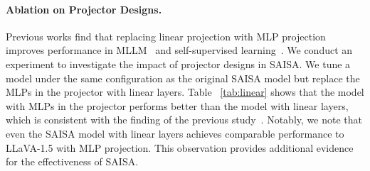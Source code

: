 \paragraph{Ablation on Projector Designs.}
Previous works find that replacing linear projection with MLP projection improves performance in MLLM~\cite{liu2024improvedbaselinesvisualinstruction} and self-supervised learning~\cite{chen2020simpleframeworkcontrastivelearning, chen2020improvedbaselinesmomentumcontrastive}.
We conduct an experiment to investigate the impact of projector designs in SAISA.
We tune a model under the same configuration as the original SAISA model but replace the MLPs in the projector with linear layers.
Table ~\ref{tab:linear} shows that the model with MLPs in the projector performs better than the model with linear layers, which is consistent with the finding of the previous study~\cite{liu2024improvedbaselinesvisualinstruction}.
Notably, we note that even the SAISA model with linear layers achieves comparable performance to LLaVA-1.5 with MLP projection.
This observation provides additional evidence for the effectiveness of SAISA.



